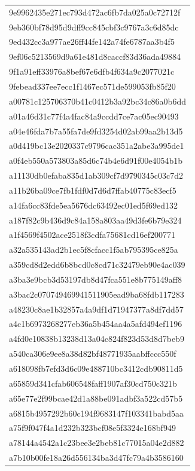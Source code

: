 \begin{tabular}{l}
9e9962435e271ec793d472ac6fb7da025a0c72712f \\
9eb360bf78d95d9dff9cc845cbf3c9767a3c6d85dc \\
9ed432cc3a977ae26ff44fe142a74fe6787aa3b4f5 \\
9ef06c5213569d9a61e481d8caccf83d36ada49884 \\
9f1a91eff33976a8bef67e6dfb4f634a9c2077021c \\
9febead337ee7ecc1f1467ec571de599053fb85f20 \\
a00781c125706370b41c0412b3a92bc34c86a0b6dd \\
a01a46d31c77f4a4fac84a9ccdd7ce7ac05ec90493 \\
a04e46fda7b7a55fa7de9fd3254d02ab99aa2b13d5 \\
a0d419bc13e2020337c9796cac351a2abe3a995de1 \\
a0f4eb550a573803a85d6c74b4e6d91f00e4054b1b \\
a11130db0efaba835d1ab309cf7d9790345c03c7d2 \\
a11b26ba09ce7fb1fdf0d7d6d7ffab40775c83ecf5 \\
a14fa6cc83fde5ea5676dc63492ec01ed5f69ed132 \\
a187f82c9b436d9c84a158a803aa49d3fe6b79e324 \\
a1f4569f4502ace2518f3cdfa75681cd16ef200771 \\
a32a535143ad2b1ec5f8cfacc1f5ab795395ce825a \\
a359cd8d2edd6b8bcd0c8cd71c32479eb90e4ac039 \\
a3ba3e9bcb3d53197db8d47fca551e8b775149aff8 \\
a3bac2c070749469941511905ead9ba68fdb117283 \\
a48230c8ae1b32857a4a9df1d71947377a8df7dd57 \\
a4c1b6973268277eb36a5b454aa4a5afd494ef1196 \\
a4fd0e10838b13238d13a04c824f823d53d8d7beb9 \\
a540ca306e9ee8a38d82bf48771935aabffccc550f \\
a618098fb7efd3d6c09e488710bc3412cdb90811d5 \\
a65859d341cfab606548faff1907af30cd750c321b \\
a65e77e2f99bcae42d1a88be091adbf3a522cd57b5 \\
a6815b4957292b60c194f9683147f103341babd5aa \\
a75f9f047f4a1d232b323bcf08e5f3324e168bf949 \\
a78144a4542a1c23bee3e2beb81c77015a04e2d882 \\
a7b10b00fe18a26d556134ba3d47fc79a4b3586160 \\

\end{tabular}
